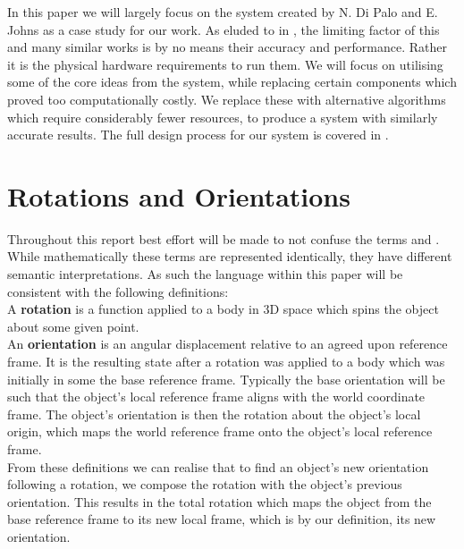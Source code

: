 In this paper we will largely focus on the  system created by N. Di Palo and E. Johns \cite{one-shot-imitation} as a case study for our work. As eluded to in , the limiting factor of this and many similar works is by no means their accuracy and performance. Rather it is the physical hardware requirements to run them. We will focus on utilising some of the core ideas from the  system, while replacing certain components which proved too computationally costly. We replace these with alternative algorithms which require considerably fewer resources, to produce a system with similarly accurate results. The full design process for our system is covered in .


\section{Rotations and Orientations}
\label{sec:rotations}
Throughout this report best effort will be made to not confuse the terms  and . While mathematically these terms are represented identically, they have different semantic interpretations. As such the language within this paper will be consistent with the following definitions:\\
A \textbf{rotation} is a function applied to a body in 3D space which spins the object about some given point.\\ %
An \textbf{orientation} is an angular displacement relative to an agreed upon reference frame. It is the resulting state after a rotation was applied to a body which was initially in some the base reference frame. Typically the base orientation will be such that the object's local reference frame aligns with the world coordinate frame. The object's orientation is then the rotation about the object's local origin, which maps the world reference frame onto the object's local reference frame.\\

From these definitions we can realise that to find an object's new orientation following a rotation, we compose the rotation with the object's previous orientation. This results in the total rotation which maps the object from the base reference frame to its new local frame, which is by our definition, its new orientation.

